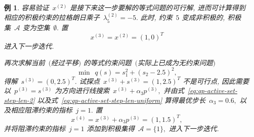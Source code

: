 \documentclass{SBCbookchapter}
\newtheorem{exam}[thm]{例}
\numberwithin{equation}{section}
\begin{document}
\begin{exam}
容易验证~${x}^{(2)}$ 是接下来这一步要解的等式问题的可行解, 进而可计算得到相应的积极约束的拉格朗日乘子~$\lambda_5^{(2)} = -5.$ 此时, 约束~$5$ 变成非积极的, 积极集~$\mathcal{A}$ 变为空集~$\emptyset.$ 置
\begin{equation*}
{x}^{(3)} = {x}^{(2)} = (1, 0)^T
\end{equation*}
进入下一步迭代.

再次求解当前~$($经过平移$)$ 的等式约束问题~$($实际上已成为无约束问题$)$
\begin{equation*}
\min ~~ q({s}) = s_1^2 + (s_2 - 2.5)^2,
\end{equation*}
得解~${s}^{(3)} = (0, 2.5)^T.$ 试探点~${x}^{(3)} + {s}^{(3)} = (1, 2.5)^T$ 不是可行点,
因此需要以~${p}^{(3)} = {s}^{(3)}$ 为方向进行线搜索~${x}^{(3)} + \alpha_3 {p}^{(3)},$
并由式~\eqref{eq:qp-active-set-step-len-2} 以及式~\eqref{eq:qp-active-set-step-len-uniform} 算得最优步长~$\alpha_3 = 0.6,$ 以及相应阻滞约束的指标~$j = 1.$ 置
\begin{equation*}
{x}^{(4)} = {x}^{(3)} + \alpha_3 {p}^{(3)} = (1, 1.5)^T,
\end{equation*}
并将阻滞约束的指标~$j = 1$ 添加到积极集得~$\mathcal{A} = \{ 1 \},$ 进入下一步迭代.


\end{exam}
\end{document}
